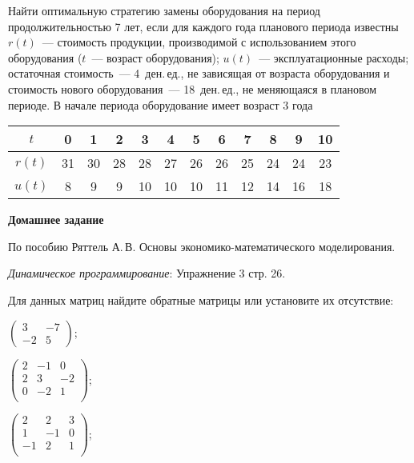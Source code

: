 \documentclass[a5paper,11pt]{extarticle}
\begin{document}
\begin{enumerate}
 
\item 
	Найти оптимальную стратегию замены оборудования на период продолжительностью 7 лет, если для каждого года планового периода известны
	$r(t)$~--- стоимость продукции, производимой с использованием этого оборудования ($t$~--- возраст оборудования); $u(t)$~--- эксплуатационные расходы; остаточная стоимость~--- 4~ден.\,ед., не зависящая от возраста оборудования и стоимость нового оборудования~--- 18~ден.\,ед., не меняющаяся в плановом периоде.  В начале периода оборудование имеет возраст 3 года
	
	{\centering \begin{tabular}{cccccccccccc}
	\hline 
$t$ &  0 &  1 &  2 &  3 &  4 &  5 &  6 &  7 &  8 &  9 &  10 \\
\hline 
$r(t)$ & 31 & 30 & 28 & 28 & 27 & 26 & 26 & 25 & 24 & 24 &  23 \\
$u(t)$ &  8 &  9 &  9 & 10 & 10 & 10 & 11 & 12 & 14 & 16 &  18 \\
\hline 
\end{tabular}\par}


{\item[] \bfseries Домашнее задание\par}

По пособию Ряттель А.\,В. Основы экономико-математического моделирования.
\item \textit{Динамическое программирование}: Упражнение 3 стр. 26.

\item 
	Для данных матриц найдите обратные матрицы или установите их отсутствие: \\
	\begin{enumerate*}
	\item 
		$\begin{pmatrix}
			3&-7\\
			-2&5
		\end{pmatrix}$;

	\item 
		${\begin{pmatrix}
			2&-1& 0\\
			2&3& -2\\
			0&-2& 1\\
		\end{pmatrix}}$;
	\item 
	$\begin{pmatrix}
		2&2&3\\
		1&-1&0\\
		-1&2&1\\
	\end{pmatrix}$;	
	\end{enumerate*}  


\end{enumerate}
\end{document}
